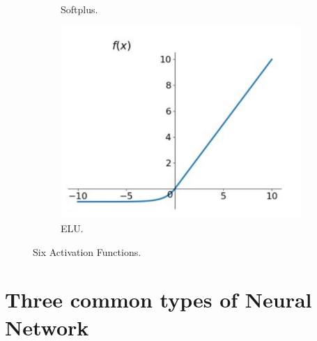 \documentclass[]{UCD_CS_FYP_Report}
\begin{document}
\begin{figure}[h!]
\begin{subfigure}[b]{0.3\linewidth}
    \caption{\label{fig:Softplus}Softplus.}
  \end{subfigure}
  \begin{subfigure}[b]{0.3\linewidth}
    \includegraphics[width=\linewidth]{Images/ELU.png}
    \caption{\label{fig:ELU}ELU.}
  \end{subfigure}
  \caption{Six Activation Functions.}
  \label{fig:Activation Functions}
\end{figure}
\section{Three common types of Neural Network}
%
\end{document}
